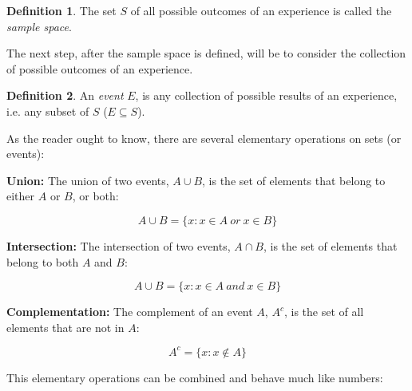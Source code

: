 \documentclass[
  oneside,
  11pt, a4paper,
  footinclude=true,
  headinclude=true,
  cleardoublepage=empty
]{scrbook}
\theoremstyle{definition}
\newtheorem{definition}{Definition}[section]
\theoremstyle{definition}
\begin{document}
            \begin{definition}{}
                The set $S$ of all possible outcomes of an experience is called the \emph{sample space}.
            \end{definition}
            
            The next step, after the sample space is defined, will be to consider the collection of possible outcomes of an experience.
            
            \begin{definition}{}
                An \emph{event} $E$, is any collection of possible results of an experience, i.e. any subset of $S$ ($E \subseteq S$).
            \end{definition}
            
            As the reader ought to know, there are several elementary operations on sets (or events):
            
            \vskip0.2cm
            \textbf{Union:} The union of two events, $A \cup B$, is the set of elements that belong to either $A$ or $B$, or both:
            
            \begin{equation}
                A \cup B = \{x : x \in A\ or\ x \in B\}
            \end{equation}{}
            
            \textbf{Intersection:} The intersection of two events, $A \cap B$, is the set of elements that belong to both $A$ and $B$:
            
            \begin{equation}
                A \cup B = \{x : x \in A\ and\ x \in B\}
            \end{equation}{}
            
            \textbf{Complementation:} The complement of an event $A$, $A^c$, is the set of all elements that are not in $A$:
            
            \begin{equation}
                A^c = \{x : x \notin A \}
            \end{equation}{}
            
            This elementary operations can be combined and behave much like numbers:
            
\end{document}
